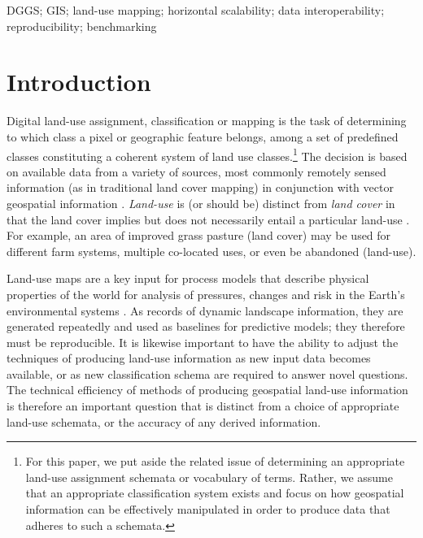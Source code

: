\documentclass[]{interact}
\theoremstyle{plain}%
\theoremstyle{definition}
\theoremstyle{remark}
\begin{document}
\begin{keywords}
\Acl{DGGS}; \acl{GIS}; land-use mapping; horizontal scalability; data interoperability; reproducibility; benchmarking
\end{keywords}

\section{Introduction} %

Digital land-use assignment, classification or mapping is the task of determining to which class a pixel or geographic feature belongs, among a set of predefined classes constituting a coherent system of land use classes.\footnote{For this paper, we put aside the related issue of determining an appropriate land-use assignment schemata or vocabulary of terms. Rather, we assume that an appropriate classification system exists and focus on how geospatial information can be effectively manipulated in order to produce data that adheres to such a schemata.} The decision is based on available data from a variety of sources, most commonly remotely sensed information (as in traditional land cover mapping) in conjunction with vector geospatial information \citep{rozenstein2011comparison}. \textit{Land-use} is (or should be) distinct from \textit{land cover} in that the land cover implies but does not necessarily entail a particular land-use \citep{fisher2005land,cihlar2001land}. For example, an area of improved grass pasture (land cover) may be used for different farm systems, multiple co-located uses, or even be abandoned (land-use).

Land-use maps are a key input for process models that describe physical properties of the world for analysis of pressures, changes and risk in the Earth's environmental systems \citep{bach2006accuracy,stehman1998design}. As records of dynamic landscape information, they are generated repeatedly and used as baselines for predictive models; they therefore must be reproducible. It is likewise important to have the ability to adjust the techniques of producing land-use information as new input data becomes available, or as new classification schema are required to answer novel questions. The technical efficiency of methods of producing geospatial land-use information is therefore an important question that is distinct from a choice of appropriate land-use schemata, or the accuracy of any derived information.
\end{document}
